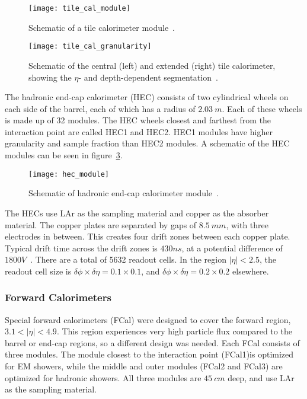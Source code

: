 \begin{figure}[!ht]\centering
\texttt{[image: tile\_cal\_module]}
\caption{Schematic of a tile calorimeter module~\cite{atlas-detector-2008}.}
\label{fig:tile_cal_module}
\end{figure}

\begin{figure}[!ht]\centering
\texttt{[image: tile\_cal\_granularity]}
\caption{Schematic of the central (left) and extended (right) tile calorimeter, showing the $\eta$- and depth-dependent segmentation~\cite{atlas-detector-2008}.}
\label{fig:tile_cal_granularity}
\end{figure}

The hadronic end-cap calorimeter (HEC) consists of two cylindrical wheels on each side of the barrel, each of which has a radius of $2.03~m$.
Each of these wheels is made up of 32 modules.
The HEC wheels closest and farthest from the interaction point are called HEC1 and HEC2.
HEC1 modules have higher granularity and sample fraction than HEC2 modules.
A schematic of the HEC modules can be seen in figure~\ref{fig:hec_module}.

\begin{figure}[!ht]\centering
\texttt{[image: hec\_module]}
\caption{Schematic of hadronic end-cap calorimeter module~\cite{atlas-detector-2008}.}
\label{fig:hec_module}
\end{figure}

The HECs use LAr as the sampling material and copper as the absorber material.
The copper plates are separated by gaps of $8.5~mm$, with three electrodes in between.
This creates four drift zones between each copper plate.
Typical drift time across the drift zones is $430 ns$, at a potential difference of $1800 V$~\cite{atlas-detector-2008}.
There are a total of 5632 readout cells.
In the region $|\eta| < 2.5$, the readout cell size is $\delta\phi \times \delta\eta = 0.1 \times 0.1$, and $\delta\phi \times \delta\eta = 0.2 \times 0.2$ elsewhere.

\subsubsection{Forward Calorimeters}\label{subsubsec:fcal}

Special forward calorimeters (FCal) were designed to cover the forward region, $3.1 < |\eta| < 4.9$.
This region experiences very high particle flux compared to the barrel or end-cap regions, so a different design was needed.
Each FCal consists of three modules.
The module closest to the interaction point (FCal1)is optimized for EM showers, while the middle and outer modules (FCal2 and FCal3) are optimized for hadronic showers.
All three modules are $45~cm$ deep, and use LAr as the sampling material.

